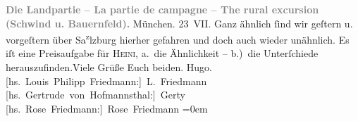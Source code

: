 \begin{ledgroupsized}[t]{13cm}
           \pstart
           \noindent{}\centering{}\textcolor{gray}{\textbf{Die Landpartie – La partie de campagne – The
                        rural excursion (Schwind u. Bauernfeld).}}\pend
           \pstart
           \centering{}{\pb}München. 23 VII.\pend
           \pstart
           Ganz ähnlich ſind wir geſtern u. vorgeſtern über Sa\substVorne{}\textsuperscript{z}\substDazwischen{}lz\substHinten{}burg hierher gefahren und doch auch wieder unähnlich. Es iſt eine
               Preisaufgabe für \textsc{Heini}, a. die Ähnlichkeit – b.) die Unterſchiede herauszufinden.\hspace*{1.5em}Viele Grüße Euch beiden.\pend
           \pstart
           \spacefill\mbox{Hugo.}{\\[\baselineskip]}\spacefill\mbox{{[}hs. Louis Philipp Friedmann:{]} L. Friedmann}{\\[\baselineskip]}\spacefill\mbox{{[}hs. Gertrude von Hofmannsthal:{]} Gerty}{\\[\baselineskip]}\spacefill\mbox{{[}hs. Rose Friedmann:{]} Rose Friedmann}\pend
           \leftskip=0em{}
         
         \endnumbering{}\end{ledgroupsized}  \newcommand{\dateiname}{L01951}\newcommand{\titel}{Hugo von Hofmannsthal u. a. an Arthur Schnitzler, 23. 7. 1910}\newcommand{\editorInnen}{Martin Anton Müller und Gerd-Hermann Susen}
      